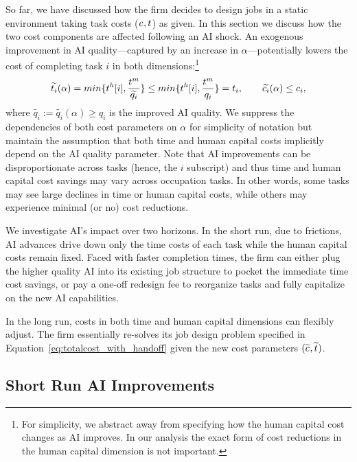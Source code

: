 \documentclass{article}
\theoremstyle{plain}
\theoremstyle{plain}
\begin{document}
So far, we have discussed how the firm decides to design jobs in a static environment taking task costs ($c_{}, t_{}$) as given.
In this section we discuss how the two cost components are affected following an AI shock.
An exogenous improvement in AI quality---captured by an increase in $\alpha$---potentially lowers the cost of completing task $i$ in both dimensions:\footnote{For simplicity, we abstract away from specifying how the human capital cost changes as AI improves. In our analysis the exact form of cost reductions in the human capital dimension is not important.}
\[
\widetilde{t_{i}}(\alpha) = min\{t^{h}_{}{}[i], \frac{t^{m}_{}{}}{\widetilde{q_{i}}}\} \le min\{t^{h}_{}{}[i], \frac{t^{m}_{}{}}{q_{i}}\} = t_{i},
\qquad
\widetilde{c_{i}}(\alpha) \le c_{i},
\]
where $\widetilde{q_{i}} := \widetilde{q_{i}}(\alpha) \geq q_{i}$ is the improved AI quality. 
We suppress the dependencies of both cost parameters on $\alpha$ for simplicity of notation but maintain the assumption that both time and human capital costs implicitly depend on the AI quality parameter.
Note that AI improvements can be disproportionate across tasks (hence, the $i$ subscript) and thus time and human capital cost savings may vary across occupation tasks.
In other words, some tasks may see large declines in time or human capital costs, while others may experience minimal (or no) cost reductions.  

We investigate AI’s impact over two horizons.
In the short run, due to frictions, AI advances drive down only the time costs of each task while the human capital costs remain fixed.
Faced with faster completion times, the firm can either plug the higher quality AI into its existing job structure to pocket the immediate time cost savings, or pay a one‐off redesign fee to reorganize tasks and fully capitalize on the new AI capabilities.

In the long run, costs in both time and human capital dimensions can flexibly adjust.
The firm essentially re-solves its job design problem specified in Equation~\ref{eq:totalcost_with_handoff} given the new cost parameters \((\widetilde{c_{}}, \widetilde{t_{}})\).


\subsection{Short Run AI Improvements}
\end{document}
